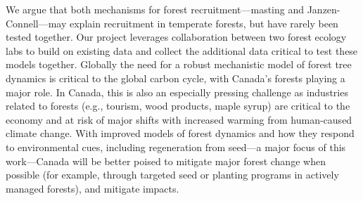 \documentclass[12pt,oneside]{article}
\begin{document}
We argue that both mechanisms for forest recruitment---masting and Janzen-Connell---may explain recruitment in temperate forests, but have rarely been tested together.\cite{bogdziewicz2024evolutionary} Our project leverages collaboration between two forest ecology labs to build on existing data and collect the additional data critical to test these models together. 
Globally the need for a robust mechanistic model of forest tree dynamics is critical to the global carbon cycle, with Canada's forests playing a major role.\cite{ipcc2021,friedlingstein2022global} In Canada, this is also an especially pressing challenge as industries related to forests (e.g., tourism, wood products, maple syrup) are critical to the economy and at risk of major shifts with increased warming from human-caused climate change. With improved models of forest dynamics and how they respond to environmental cues, including regeneration from seed---a major focus of this work---Canada will be better poised to mitigate major forest change when possible (for example, through targeted seed or planting programs in actively managed forests), and mitigate impacts. 

\end{document}
